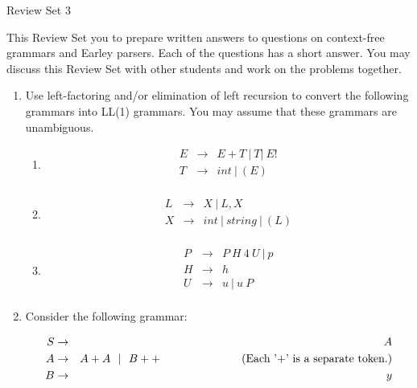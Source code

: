 \documentclass[12pt]{article}
\begin{document}
\begin{center}
{\large Review Set 3} 
\end{center}

This Review Set you to prepare written answers to questions on
context-free grammars and Earley parsers. 
Each of the questions has a short answer. You
may discuss this Review Set with other students and work on the
problems together.  

\begin{enumerate}

\item Use left-factoring and/or elimination of left recursion to convert
the following grammars into LL(1) grammars. You may assume that these
grammars are unambiguous.

\begin{enumerate}

\item

\begin{eqnarray*}
E & \rightarrow & E + T \ | \ T | \ E !\\
T & \rightarrow & int \ | \ ( E ) \\
\end{eqnarray*}

\item

\begin{eqnarray*}
L & \rightarrow & X \ | \ L , X  \\
X & \rightarrow & int \ | \ string \ | \ ( L ) \\
\end{eqnarray*}

\item

\begin{eqnarray*}
P & \rightarrow & P \ H \ 4 \ U \ | \ p \\
H & \rightarrow & h \\
U & \rightarrow & u \ | \ u \ P \\
\end{eqnarray*}

\end{enumerate}

\item 

Consider the following grammar:

\begin{eqnarray*}
  S & \rightarrow & A \\
  A & \rightarrow & A + A \ \ |\ \  B + + \hbox{\hskip 1in (Each '+' is a separate token.)}\\
  B & \rightarrow & y
\end{eqnarray*}


\end{enumerate}
\end{document}
